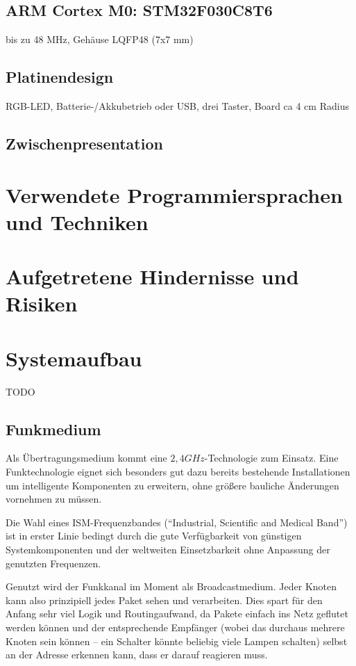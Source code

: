 \documentclass{IEEEtran}
\begin{document}
    \subsection{ARM Cortex M0: STM32F030C8T6}

        bis zu 48 MHz, Gehäuse LQFP48 (7x7 mm)

    \subsection{Platinendesign}

        RGB-LED, Batterie-/Akkubetrieb oder USB, drei Taster, Board ca 4 cm Radius

    \subsection{Zwischenpresentation}
    

\section{Verwendete Programmiersprachen und Techniken}


\section{Aufgetretene Hindernisse und Risiken}

\section{Systemaufbau}
    TODO

    \subsection{Funkmedium}
        Als Übertragungsmedium kommt eine $2,4GHz$-Technologie
        zum Einsatz. Eine Funktechnologie eignet sich besonders gut dazu
        bereits bestehende Installationen um intelligente Komponenten
        zu erweitern, ohne größere bauliche Änderungen vornehmen zu müssen.

        Die Wahl eines ISM-Frequenzbandes (\enquote{Industrial, Scientific and Medical Band})
        ist in erster Linie bedingt durch die gute Verfügbarkeit von günstigen
        Systemkomponenten und der weltweiten Einsetzbarkeit ohne Anpassung der
        genutzten Frequenzen.

        Genutzt wird der Funkkanal im Moment als Broadcastmedium.
        Jeder Knoten kann also prinzipiell jedes Paket sehen und verarbeiten.
        Dies spart für den Anfang sehr viel Logik und Routingaufwand,
        da Pakete einfach ins Netz geflutet werden können und der entsprechende
        Empfänger (wobei das durchaus mehrere Knoten sein können -- ein Schalter
        könnte beliebig viele Lampen schalten) selbst an der Adresse erkennen
        kann, dass er darauf reagieren muss.
\end{document}
